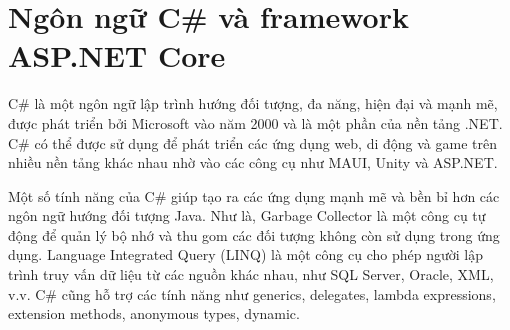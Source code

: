 \documentclass[../DoAn.tex]{subfiles}
\begin{document}






\section{Ngôn ngữ C\# và framework ASP.NET Core}
\label{section:3.1}
C\# là một ngôn ngữ lập trình hướng đối tượng, đa năng, hiện đại và mạnh mẽ, được phát triển bởi Microsoft vào năm 2000 và là một phần của nền tảng .NET. C\# có thể được sử dụng để phát triển các ứng dụng web, di động và game trên nhiều nền tảng khác nhau nhờ vào các công cụ như MAUI, Unity và ASP.NET.

Một số tính năng của C\# giúp tạo ra các ứng dụng mạnh mẽ và bền bỉ hơn các ngôn ngữ hướng đối tượng Java. Như là, Garbage Collector là một công cụ tự động để quản lý bộ nhớ và thu gom các đối tượng không còn sử dụng trong ứng dụng. Language Integrated Query (LINQ) là một công cụ cho phép người lập trình truy vấn dữ liệu từ các nguồn khác nhau, như SQL Server, Oracle, XML, v.v. C\# cũng hỗ trợ các tính năng như generics, delegates, lambda expressions, extension methods, anonymous types, dynamic.
\end{document}
